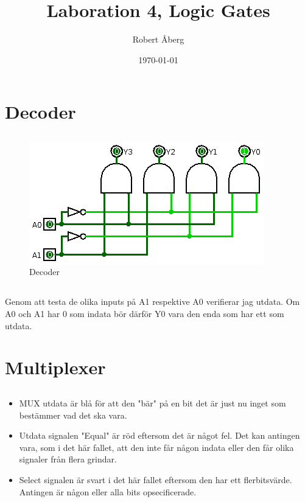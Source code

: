 \documentclass[11pt]{article}
\author{Robert Åberg}
\date{\today}
\title{Laboration 4, Logic Gates}
\begin{document}
\maketitle
\tableofcontents




\section{Decoder}
\label{sec:orgheadline3}

\subsection{}
\label{sec:orgheadline1}
\begin{figure}[htb]
\centering
\includegraphics[width=.9\linewidth]{./Assignment1.png}
\caption{\label{fig:orgparagraph1}
Decoder}
\end{figure}


\subsection{}
\label{sec:orgheadline2}
Genom att testa de olika inputs på A1 respektive A0 verifierar jag utdata. Om A0 och A1 har 0 som indata bör därför Y0 vara den enda som har ett som utdata.


\section{Multiplexer}
\label{sec:orgheadline6}

\subsection{}
\label{sec:orgheadline4}
\begin{itemize}
\item MUX utdata är blå för att den "bär" på en bit det är just nu inget som bestämmer vad det ska vara.
\item Utdata signalen "Equal" är röd eftersom det är något fel. Det kan antingen vara, som i det här fallet, att den inte får någon indata eller den får olika signaler från flera grindar.
\item Select signalen är svart i det här fallet eftersom den har ett flerbitsvärde. Antingen är någon eller alla bits opsecificerade.
\end{itemize}
\end{document}
